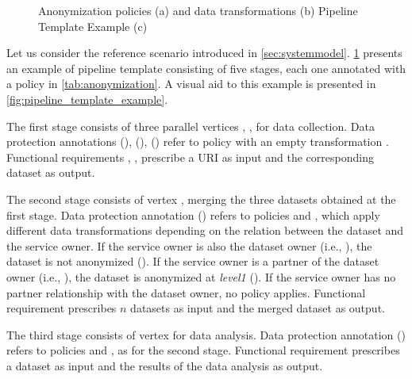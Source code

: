 \begin{figure}[ht!]
  \caption{Anonymization policies (a) and data transformations (b) Pipeline Template Example (c)}\label{tab:anonymization}
  \label{fig:service_composition_template}
\end{figure}

\begin{example}[\bf \pipelineTemplate]\label{ex:template}
Let us consider the reference scenario introduced in \cref{sec:systemmodel}.
\cref{fig:service_composition_template} presents an example of pipeline template consisting of five stages, each one annotated with a policy in \cref{tab:anonymization}.
{\color{OurColor}A visual aid to this example is presented in \cref{fig:pipeline_template_example}}.

The first stage consists of three parallel vertices , ,  for data collection.
Data protection annotations \myLambda(), \myLambda(), \myLambda() refer to policy  with an empty transformation .
Functional requirements , ,   prescribe a URI as input and the corresponding dataset as output.

The second stage consists of vertex , merging the three datasets obtained at the first stage. Data protection annotation \myLambda() refers to policies  and , which apply different data transformations depending on the relation between the dataset and the service owner.
If the service owner is also the dataset owner (i.e., \pone), the dataset is not anonymized (). If the service owner is a partner of the dataset owner (i.e., \ptwo), the dataset is anonymized at \emph{level1} (). If the service owner has no partner relationship with the dataset owner, no policy applies.
Functional requirement  prescribes $n$ datasets as input and the merged dataset as output.

The third stage consists of vertex   for data analysis.
Data protection annotation \myLambda() refers to policies  and , as for the second stage.
Functional requirement  prescribes a dataset as input and the results of the data analysis as output.


\end{example}
